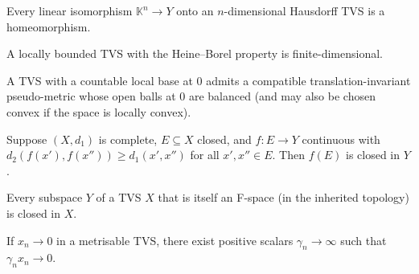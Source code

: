\begin{theorem}
  \label{thm:fd-iso-homeomorph}
  \leanok
  Every linear isomorphism $\mathbb K^n \to Y$ onto an
  $n$-dimensional Hausdorff TVS is a homeomorphism.
\end{theorem}

\begin{theorem}
  \label{thm:locallyBounded-HB-finiteDim}
  \leanok
  A locally bounded TVS with the Heine--Borel property is
  finite-dimensional.
\end{theorem}

\begin{theorem}
  \label{thm:countable-base-metrisable}
  \leanok
  A TVS with a countable local base at $0$ admits a compatible
  translation-invariant pseudo-metric whose open balls at $0$ are
  balanced (and may also be chosen convex if the space is locally
  convex).
\end{theorem}

\begin{theorem}
  \label{thm:dilation-principle}
  \leanok
  Suppose $(X, d_1)$ is complete, $E \subseteq X$ closed, and
  $f \colon E \to Y$ continuous with $d_2(f(x'), f(x'')) \ge d_1(x',
  x'')$ for all $x', x'' \in E$. Then $f(E)$ is closed in $Y$.
\end{theorem}

\begin{theorem}
  \label{thm:fSpace-subspace-closed}
  \leanok
  Every subspace $Y$ of a TVS $X$ that is itself an F-space (in the
  inherited topology) is closed in $X$.
\end{theorem}

\begin{theorem}
  \label{thm:null-rescale}
  \leanok
  If $x_n \to 0$ in a metrisable TVS, there exist positive scalars
  $\gamma_n \to \infty$ such that $\gamma_n x_n \to 0$.
\end{theorem}

